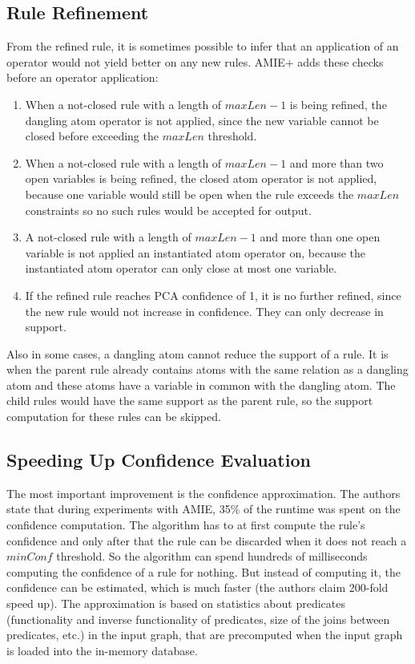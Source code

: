\subsection{Rule Refinement}

From the refined rule, it is sometimes possible to infer that an application of an operator would not yield better on any new rules. AMIE+ adds these checks before an operator application:

\begin{enumerate}
    \item When a not-closed rule with a length of $maxLen - 1$ is being refined, the dangling atom operator is not applied, since the new variable cannot be closed before exceeding the $maxLen$ threshold.
    \item When a not-closed rule with a length of $maxLen - 1$ and more than two open variables is being refined, the closed atom operator is not applied, because one variable would still be open when the rule exceeds the $maxLen$ constraints so no such rules would be accepted for output.
    \item A not-closed rule with a length of $maxLen - 1$ and more than one open variable is not applied an instantiated atom operator on, because the instantiated atom operator can only close at most one variable.
    \item If the refined rule reaches PCA confidence of 1, it is no further refined, since the new rule would not increase in confidence. They can only decrease in support.
\end{enumerate}

Also in some cases, a dangling atom cannot reduce the support of a rule. It is when the parent rule already contains atoms with the same relation as a dangling atom and these atoms have a variable in common with the dangling atom. The child rules would have the same support as the parent rule, so the support computation for these rules can be skipped.

\subsection{Speeding Up Confidence Evaluation}

The most important improvement is the confidence approximation. The authors state that during experiments with AMIE, 35\% of the runtime was spent on the confidence computation. The algorithm has to at first compute the rule's confidence and only after that the rule can be discarded when it does not reach a $minConf$ threshold. So the algorithm can spend hundreds of milliseconds computing the confidence of a rule for nothing. But instead of computing it, the confidence can be estimated, which is much faster (the authors claim 200-fold speed up). The approximation is based on statistics about predicates (functionality and inverse functionality of predicates, size of the joins between predicates, etc.) in the input graph, that are precomputed when the input graph is loaded into the in-memory database. 

